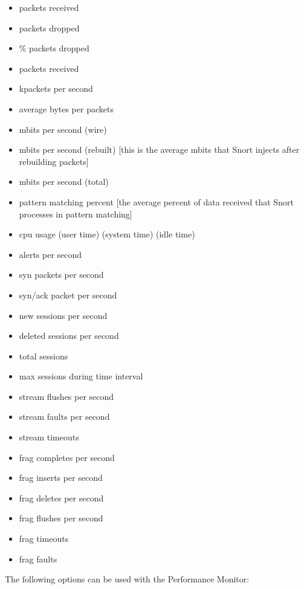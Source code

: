 \documentclass[english]{report}
\begin{document}
\begin{itemize}
\item packets received
\item packets dropped
\item \% packets dropped
\item packets received
\item kpackets per second
\item average bytes per packets
\item mbits per second (wire)
\item mbits per second (rebuilt) [this is the average mbits that Snort injects after rebuilding packets]
\item mbits per second (total)
\item pattern matching percent [the average percent of data received that Snort processes in pattern matching]
\item cpu usage (user time) (system time) (idle time)
\item alerts per second
\item syn packets per second
\item syn/ack packet per second
\item new sessions per second
\item deleted sessions per second
\item total sessions
\item max sessions during time interval
\item stream flushes per second
\item stream faults per second
\item stream timeouts
\item frag completes per second
\item frag inserts per second
\item frag deletes per second
\item frag flushes per second
\item frag timeouts
\item frag faults
\end{itemize}

The following options can be used with the Performance Monitor:
\end{document}
